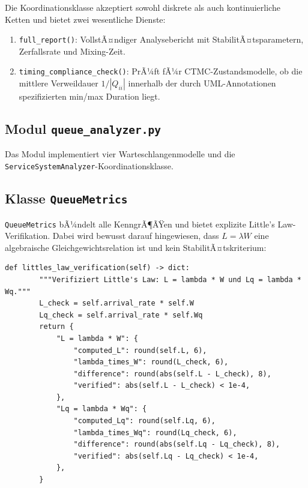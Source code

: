 ﻿\documentclass[a4paper,12pt]{report}
\theoremstyle{definition}
\begin{document}
Die Koordinationsklasse akzeptiert sowohl diskrete als auch kontinuierliche
Ketten und bietet zwei wesentliche Dienste:

\begin{enumerate}
	\item[-] \texttt{full\_report()}: VollstÃ¤ndiger Analysebericht mit
	StabilitÃ¤tsparametern, Zerfallsrate und Mixing-Zeit.
	\item[-] \texttt{timing\_compliance\_check()}: PrÃ¼ft fÃ¼r CTMC-Zustandsmodelle,
	ob die mittlere Verweildauer $1/|Q_{ii}|$ innerhalb der durch
	UML-Annotationen spezifizierten min/max Duration liegt.
\end{enumerate}

\subsection{Modul \texttt{queue\_analyzer.py}}
\label{sec:queue-analyzer-impl}

Das Modul implementiert vier Warteschlangenmodelle und die
\texttt{ServiceSystemAnaly\newline zer}-Koordinationsklasse.

\subsection{Klasse \texttt{QueueMetrics}}

\texttt{QueueMetrics} bÃ¼ndelt alle KenngrÃ¶ÃŸen und bietet explizite
Little's Law-Verifikation. Dabei wird bewusst darauf hingewiesen, dass
$L = \lambda W$ eine algebraische Gleichgewichtsrelation ist und kein
StabilitÃ¤tskriterium:

\begin{lstlisting}[style=python, caption={Little's Law Verifikation mit theoretischem Hinweis}, label=lst:littles-law-impl]
def littles_law_verification(self) -> dict:
        """Verifiziert Little's Law: L = lambda * W und Lq = lambda * Wq."""
        L_check = self.arrival_rate * self.W
        Lq_check = self.arrival_rate * self.Wq
        return {
            "L = lambda * W": {
                "computed_L": round(self.L, 6),
                "lambda_times_W": round(L_check, 6),
                "difference": round(abs(self.L - L_check), 8),
                "verified": abs(self.L - L_check) < 1e-4,
            },
            "Lq = lambda * Wq": {
                "computed_Lq": round(self.Lq, 6),
                "lambda_times_Wq": round(Lq_check, 6),
                "difference": round(abs(self.Lq - Lq_check), 8),
                "verified": abs(self.Lq - Lq_check) < 1e-4,
            },
        }
\end{lstlisting}
\end{document}
